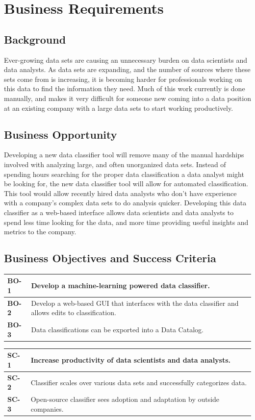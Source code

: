 \documentclass[12pt,oneside,letterpaper]{article}
\begin{document}
\newpage

\section{Business Requirements}
\subsection{Background}
Ever-growing data sets are causing an unnecessary burden on data scientists and data analysts. As data sets are expanding, and the number of sources where these sets come from is increasing, it is becoming harder for professionals working on this data to find the information they need. Much of this work currently is done manually, and makes it very difficult for someone new coming into a data position at an existing company with a large data sets to start working productively.
\subsection{Business Opportunity}
Developing a new data classifier tool will remove many of the manual hardships involved with analyzing large, and often unorganized data sets. Instead of spending hours searching for the proper data classification a data analyst might be looking for, the new data classifier tool will allow for automated classification. This tool would allow recently hired data analysts who don't have experience with a company's complex data sets to do analysis quicker. Developing this data classifier as a web-based interface allows data scientists and data analysts to spend less time looking for the data, and more time providing useful insights and metrics to the company.
\subsection{Business Objectives and Success Criteria}
\begin{tabular}{|p{1in}|p{4.5in}|}
\hline
\textbf{BO-1}&Develop a machine-learning powered data classifier.\\
\hline
\textbf{BO-2}&Develop a web-based GUI that interfaces with the data classifier and allows edits to classification.\\
\hline
\textbf{BO-3}&Data classifications can be exported into a Data Catalog.\\
\hline
\end{tabular}
\newline
\vspace{1cm}
\newline
\begin{tabular}{|p{1in}|p{4.5in}|}
\hline
\textbf{SC-1}&Increase productivity of data scientists and data analysts.\\
\hline
\textbf{SC-2}&Classifier scales over various data sets and successfully categorizes data.\\
\hline
\textbf{SC-3}&Open-source classifier sees adoption and adaptation by outside companies.\\
\hline
\end{tabular}
\end{document}

